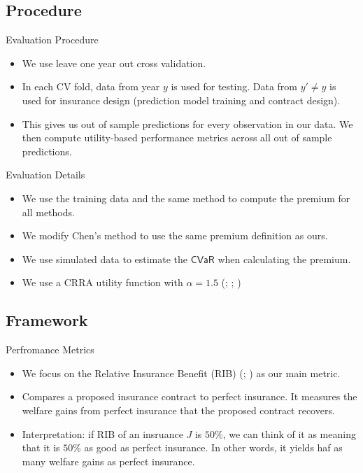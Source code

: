 \documentclass{beamer}
\begin{document}
\subsection{Procedure}
\begin{frame}{Evaluation Procedure}
    \begin{itemize}
        \setlength\itemsep{2em}
        \item We use leave one year out cross validation. 
        \item In each CV fold, data from year $y$ is used for testing. Data from $y'\neq y$ is used for insurance design (prediction model training and contract design).
        \item This gives us out of sample predictions for every observation in our data. We then compute utility-based performance metrics across all out of sample predictions. 
    \end{itemize}
\end{frame}

\begin{frame}{Evaluation Details}
    \begin{itemize}
        \item We use the training data and the same method to compute the premium for all methods.
        \item We modify Chen's method to use the same premium definition as ours. 
        \item We use simulated data to estimate the $\textsf{CVaR}$ when calculating the premium. 
        \item We use a CRRA utility function with $\alpha=1.5$ (\cite{flatnes2018improving}; \cite{estefania2024breaking}; \cite{jensen2019does})
    \end{itemize}
    
\end{frame}

\subsection{Framework}
\begin{frame}{Perfromance Metrics}
    \begin{itemize}
        \item We focus on the Relative Insurance Benefit (RIB) (\cite{kenduiywo2021evaluating}; \cite{estefania2024breaking}) as our main metric. 
        \item Compares a proposed insurance contract to perfect insurance. It measures the welfare gains from perfect insurance that the proposed contract recovers. 
        \item Interpretation: if RIB of an insruance $J$ is $50\%$, we can think of it as meaning that it is $50\%$ as good as perfect insurance. In other words, it yields haf as many welfare gains as perfect insurance. 
    \end{itemize}
    
\end{frame}
\end{document}
